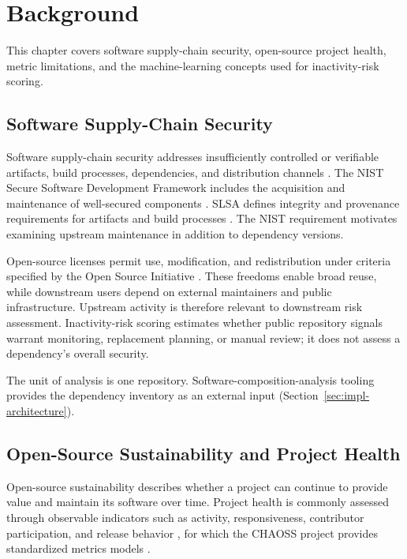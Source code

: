 \chapter{Background}
\label{chap:background}

This chapter covers software supply-chain security, open-source project health,
metric limitations, and the machine-learning concepts used for inactivity-risk
scoring.

\section{Software Supply-Chain Security}
\label{sec:background-supply-chain-security}

Software supply-chain security addresses insufficiently controlled or
verifiable artifacts, build processes, dependencies, and distribution channels
\cite{souppaya2022ssdf,slsa2025spec}. The NIST Secure Software Development
Framework includes the acquisition and maintenance of well-secured components
\cite{souppaya2022ssdf}. SLSA defines integrity and provenance requirements for
artifacts and build processes \cite{slsa2025spec}. The NIST requirement motivates
examining upstream maintenance in addition to dependency versions.

Open-source licenses permit use, modification, and redistribution under criteria
specified by the Open Source Initiative \cite{osiOpenSourceDefinition}. These
freedoms enable broad reuse, while downstream users depend on external
maintainers and public infrastructure. Upstream activity is therefore relevant
to downstream risk assessment. Inactivity-risk scoring estimates whether public
repository signals warrant monitoring, replacement planning, or manual review;
it does not assess a dependency's overall security.

The unit of analysis is one repository. Software-composition-analysis tooling
provides the dependency inventory as an external input
(Section~\ref{sec:impl-architecture}).

\section{Open-Source Sustainability and Project Health}
\label{sec:background-oss-health}

Open-source sustainability describes whether a project can continue to provide value and maintain its software over time. Project health is commonly assessed through observable indicators such as activity, responsiveness, contributor participation, and release behavior \cite{goggins2021transparent}, for which the CHAOSS project provides standardized metrics models \cite{chaossStarterProjectHealth}.

